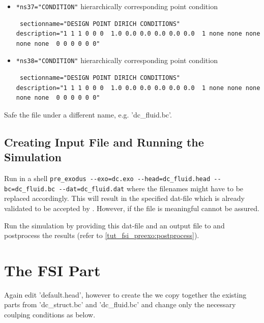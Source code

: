 \begin{itemize}
\begin{small}
\begin{verbatim}
\end{verbatim} \end{small} \item \verb|*ns37="CONDITION"| \qquad hierarchically corresponding point condition
\begin{small} \begin{verbatim} sectionname="DESIGN POINT DIRICH CONDITIONS"
description="1 1 1 0 0 0  1.0 0.0 0.0 0.0 0.0 0.0  1 none none none none none  0 0 0 0 0 0"
\end{verbatim} \end{small} \item \verb|*ns38="CONDITION"| \qquad hierarchically corresponding point condition
\begin{small} \begin{verbatim} sectionname="DESIGN POINT DIRICH CONDITIONS"
description="1 1 1 0 0 0  1.0 0.0 0.0 0.0 0.0 0.0  1 none none none none none  0 0 0 0 0 0"
\end{verbatim} \end{small}

\end{itemize}
Safe the file under a different name, e.g. 'dc\_fluid.bc'.

\subsection{Creating \baci{} Input File and Running the Simulation}
Run in a shell \verb|pre_exodus --exo=dc.exo --head=dc_fluid.head --bc=dc_fluid.bc --dat=dc_fluid.dat| where the filenames might have to be replaced accordingly. This will result in the specified dat-file which is already validated to be accepted by \baci{}. However, if the file is meaningful cannot be assured.

Run the simulation by providing this dat-file and an output file to \baci{} and postprocess the results (refer to \ref{tut_fsi_preexo:postprocess}).

\section{The FSI Part}
Again edit 'default.head', however to create the \bc we copy together the existing parts from 'dc\_struct.bc' and 'dc\_fluid.bc' and change only the necessary coulping conditions as below.


